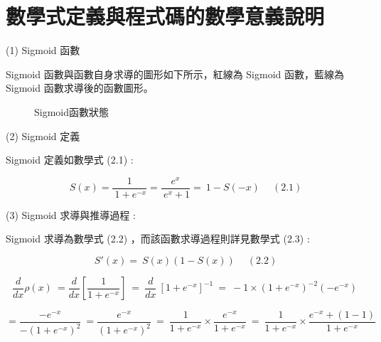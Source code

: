 \documentclass[11pt,UTF8]{ctexart}
\begin{document}
\section{數學式定義與程式碼的數學意義說明}

(1) Sigmoid 函數

Sigmoid 函數與函數自身求導的圖形如下所示，紅線為 Sigmoid 函數，藍線為 Sigmoid 函數求導後的函數圖形。

\begin{figure}[H]
\centering  %
\caption{Sigmoid函數狀態}
\label{Fig.main}
\end{figure}

(2) Sigmoid 定義

Sigmoid 定義如數學式 (2.1) :

$$ \ S(x) = \frac{1}{ \ 1+e^{-x}} =  \frac{e^{x}}{ \ e^{x} + 1} = \ 1 - S(-x) \quad \ (2.1)$$

(3) Sigmoid 求導與推導過程 :

Sigmoid 求導為數學式 (2.2) ，而該函數求導過程則詳見數學式 (2.3) :

$$ \ S'(x) = \ S(x) ( 1 - S(x)) \quad \ (2.2)$$

$$ \frac{d}{dx}\rho(x)\ =\frac{d}{dx}\left[\frac{1}{1+e^{-x}}\right]\ =\ \frac{d}{dx}\ \left[1+e^{-x}\right]^{-1}\ =\ -1\times\left(1+e^{-x}\right)^{-2}\left(-e^{-x}\right)$$

$$=\frac{{-e}^{-x}}{{-(1+e^{-x})}^2}\ =\frac{e^{-x}}{\left(1+e^{-x}\right)^2}\ =\ \frac{1}{1+e^{-x}}\times\frac{e^{-x}}{1+e^{-x}}\ =\ \frac{1}{1+e^{-x}}\times\frac{e^{-x}+(1-1)}{1+e^{-x}}$$
\end{document}
